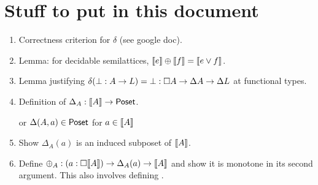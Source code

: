 \documentclass{rntz}
\begin{document}

\section{Stuff to put in this document}

\begin{enumerate}
\item Correctness criterion for $\delta$ (see google doc).
\item Lemma: for decidable semilattices, $\llbracket{e}\rrbracket \oplus \llbracket{f}\rrbracket = \llbracket{e \vee
  f}\rrbracket$.
\item Lemma justifying $\delta (\bot : A \to L) = \bot : \square{A} \to
  \Delta{A} \to \Delta{L}$ at functional types.
\item Definition of $\Delta_A : {\llbracket{A}\rrbracket} \to \mathsf{Poset}$.

  or $\Delta(A, a) \in \mathsf{Poset}$ for $a \in {\llbracket{A}\rrbracket}$
\item Show $\Delta_A(a)$ is an induced subposet of ${\llbracket{A}\rrbracket}$.

\item Define $\oplus_A : (a : \square{{\llbracket{A}\rrbracket}}) \to \Delta_{A}({a}) \to {\llbracket{A}\rrbracket}$
  and show it is monotone in its second argument.
  This also involves defining \zero.

\end{enumerate}
\end{document}
